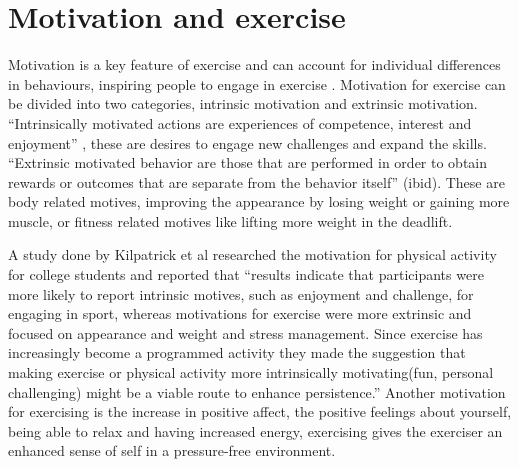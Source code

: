 \section{Motivation and exercise}
Motivation is a key feature of exercise and can account for individual differences in behaviours, inspiring people to engage in exercise \cite{Patel2015}.
Motivation for exercise can be divided into two categories, intrinsic motivation and extrinsic motivation. “Intrinsically motivated actions are experiences of competence, interest and enjoyment” \cite{Richard}, these are desires to engage new challenges and expand the skills.  “Extrinsic motivated behavior are those that are performed in order to obtain rewards or outcomes that are separate from the behavior itself” (ibid). These are body related motives, improving the appearance by losing weight or gaining more muscle, or fitness related motives like lifting more weight in the deadlift.  

A study done by Kilpatrick et al\cite{Kilpatrick} researched the motivation for physical activity for college students and reported that “results indicate that participants were more likely to report intrinsic motives, such as enjoyment and challenge, for engaging in sport,  whereas motivations for exercise were  more extrinsic and focused on appearance and weight and stress management. Since exercise has increasingly become a programmed activity \cite{Richard} they made the suggestion that making exercise or physical activity more intrinsically motivating(fun, personal challenging) might be a viable route to enhance persistence.” Another motivation for exercising is the increase in positive affect, the positive feelings about yourself, being able to relax and having increased energy, exercising gives the exerciser an enhanced sense of self in a pressure-free environment\cite{Frederick}.
